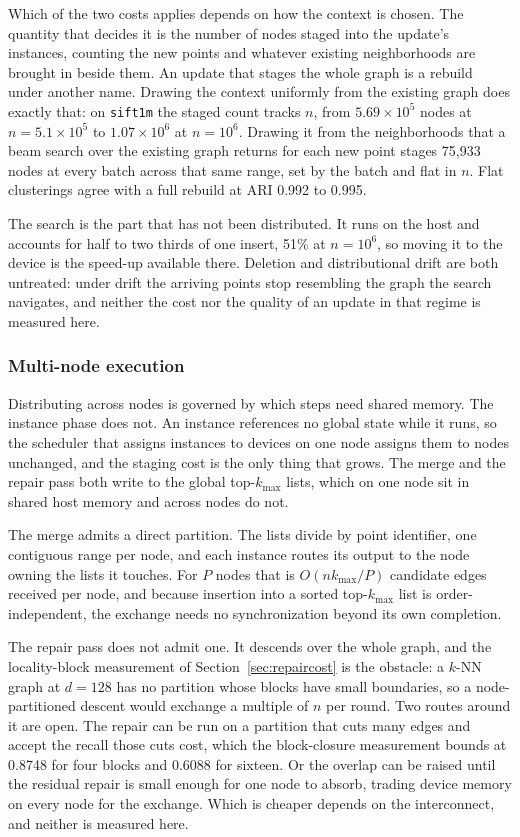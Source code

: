 \documentclass{ieeeaccess}
\newcommand{\kmax}{k_{\max}}
\begin{document}
Which of the two costs applies depends on how the context is chosen. The
quantity that decides it is the number of nodes staged into the update's
instances, counting the new points and whatever existing neighborhoods are
brought in beside them. An update that stages the whole graph is a rebuild under
another name. Drawing the context uniformly from the existing graph does exactly
that: on \texttt{sift1m} the staged count tracks $n$, from $5.69\times10^5$ nodes
at $n = 5.1\times10^5$ to $1.07\times10^6$ at $n = 10^6$. Drawing it from the neighborhoods that a beam search over the existing
graph returns for each new point stages 75{,}933 nodes at every batch across that
same range, set by the batch and flat in $n$. Flat clusterings agree with a full
rebuild at ARI 0.992 to 0.995.

The search is the part that has not been distributed. It runs on the host and
accounts for half to two thirds of one insert, 51\% at $n = 10^6$, so moving it
to the device is the speed-up available there. Deletion and distributional drift
are both untreated: under drift the arriving points stop resembling the graph the
search navigates, and neither the cost nor the quality of an update in that
regime is measured here.

\subsubsection{Multi-node execution}

Distributing across nodes is governed by which steps need shared memory. The
instance phase does not. An instance references no global state while it runs, so
the scheduler that assigns instances to devices on one node assigns them to nodes
unchanged, and the staging cost is the only thing that grows. The merge and the
repair pass both write to the global top-$\kmax$ lists, which on one node sit in
shared host memory and across nodes do not.

The merge admits a direct partition. The lists divide by point identifier, one
contiguous range per node, and each instance routes its output to the node
owning the lists it touches. For $P$ nodes that is $O(n\kmax/P)$ candidate edges
received per node, and because insertion into a sorted top-$\kmax$ list is
order-independent, the exchange needs no synchronization beyond its own
completion.

The repair pass does not admit one. It descends over the whole graph, and the
locality-block measurement of Section~\ref{sec:repaircost} is the obstacle: a
$k$-NN graph at $d = 128$ has no partition whose blocks have small boundaries,
so a node-partitioned descent would exchange a multiple of $n$ per round. Two
routes around it are open. The repair can be run on a partition that cuts many
edges and accept the recall those cuts cost, which the block-closure measurement
bounds at 0.8748 for four blocks and 0.6088 for sixteen. Or the overlap can be
raised until the residual repair is small enough for one node to absorb, trading
device memory on every node for the exchange. Which is cheaper depends on the
interconnect, and neither is measured here.
\end{document}
